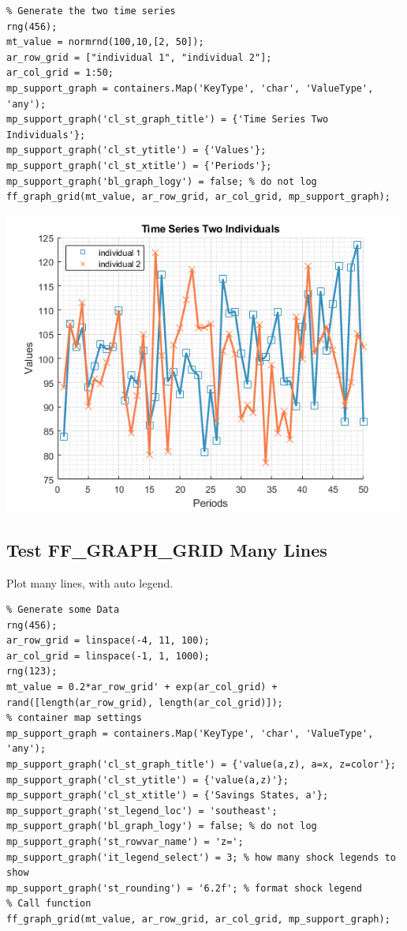 \documentclass[
]{book}
\begin{document}
\begin{verbatim}
% Generate the two time series
rng(456);
mt_value = normrnd(100,10,[2, 50]);
ar_row_grid = ["individual 1", "individual 2"];
ar_col_grid = 1:50;
mp_support_graph = containers.Map('KeyType', 'char', 'ValueType', 'any');
mp_support_graph('cl_st_graph_title') = {'Time Series Two Individuals'};
mp_support_graph('cl_st_ytitle') = {'Values'};
mp_support_graph('cl_st_xtitle') = {'Periods'};
mp_support_graph('bl_graph_logy') = false; % do not log
ff_graph_grid(mt_value, ar_row_grid, ar_col_grid, mp_support_graph);
\end{verbatim}

\includegraphics[width=5.20833in,height=\textheight]{img/fx_graph_grid_images/figure_2.png}

\hypertarget{test-ff_graph_grid-many-lines}{%
\subsection{Test FF\_GRAPH\_GRID Many Lines}\label{test-ff_graph_grid-many-lines}}

Plot many lines, with auto legend.

\begin{verbatim}
% Generate some Data
rng(456);
ar_row_grid = linspace(-4, 11, 100);
ar_col_grid = linspace(-1, 1, 1000);
rng(123);
mt_value = 0.2*ar_row_grid' + exp(ar_col_grid) + rand([length(ar_row_grid), length(ar_col_grid)]);
% container map settings
mp_support_graph = containers.Map('KeyType', 'char', 'ValueType', 'any');
mp_support_graph('cl_st_graph_title') = {'value(a,z), a=x, z=color'};
mp_support_graph('cl_st_ytitle') = {'value(a,z)'};
mp_support_graph('cl_st_xtitle') = {'Savings States, a'};
mp_support_graph('st_legend_loc') = 'southeast';
mp_support_graph('bl_graph_logy') = false; % do not log
mp_support_graph('st_rowvar_name') = 'z=';
mp_support_graph('it_legend_select') = 3; % how many shock legends to show
mp_support_graph('st_rounding') = '6.2f'; % format shock legend
% Call function
ff_graph_grid(mt_value, ar_row_grid, ar_col_grid, mp_support_graph);
\end{verbatim}
\end{document}
